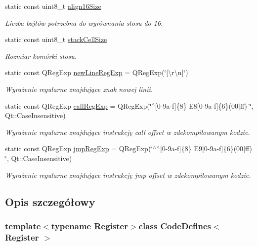 \begin{DoxyCompactItemize}
static const uint8\-\_\-t \hyperlink{class_code_defines_a83820641d7045e035f2a4619a23d2755}{align16\-Size}
\begin{DoxyCompactList}\small\item\em Liczba bajtów potrzebna do wyrównania stosu do 16. \end{DoxyCompactList}\item 
static const uint8\-\_\-t \hyperlink{class_code_defines_add79526fe978503123140edf11497d66}{stack\-Cell\-Size}
\begin{DoxyCompactList}\small\item\em Rozmiar komórki stosu. \end{DoxyCompactList}\item 
static const Q\-Reg\-Exp \hyperlink{class_code_defines_a767cf243acab61bf7c6f1046002425e1}{new\-Line\-Reg\-Exp} = Q\-Reg\-Exp(\char`\"{}\mbox{[}\textbackslash{}r\textbackslash{}n\mbox{]}\char`\"{})
\begin{DoxyCompactList}\small\item\em Wyrażenie regularne znajdujące znak nowej linii. \end{DoxyCompactList}\item 
static const Q\-Reg\-Exp \hyperlink{class_code_defines_a54f3fde2a7976ac5c36b9a9aa2efb37e}{call\-Reg\-Exp} = Q\-Reg\-Exp(\char`\"{}$^\wedge$\mbox{[}0-\/9a-\/f\mbox{]}\{8\} E8\mbox{[}0-\/9a-\/f\mbox{]}\{6\}(00$|$ff) \char`\"{}, Qt\-::\-Case\-Insensitive)
\begin{DoxyCompactList}\small\item\em Wyrażenie regularne znajdujące instrukcję call offset w zdekompilowanym kodzie. \end{DoxyCompactList}\item 
static const Q\-Reg\-Exp \hyperlink{class_code_defines_a2f214288be4f17edf89f463162c59e30}{jmp\-Reg\-Exp} = Q\-Reg\-Exp(\char`\"{}$^\wedge$$^\wedge$\mbox{[}0-\/9a-\/f\mbox{]}\{8\} E9\mbox{[}0-\/9a-\/f\mbox{]}\{6\}(00$|$ff) \char`\"{}, Qt\-::\-Case\-Insensitive)
\begin{DoxyCompactList}\small\item\em Wyrażenie regularne znajdujące instrukcję jmp offset w zdekompilowanym kodzie. \end{DoxyCompactList}\end{DoxyCompactItemize}


\subsection{Opis szczegółowy}
\subsubsection*{template$<$typename Register$>$class Code\-Defines$<$ Register $>$}


